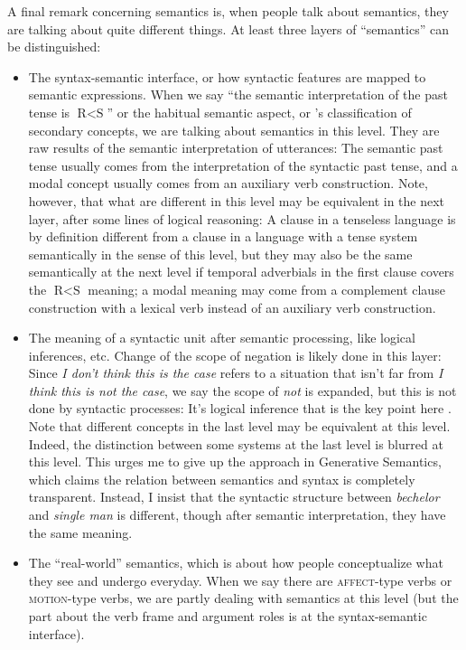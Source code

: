 \documentclass[UTF8, a4paper, oneside, scheme=plain]{ctexrep}
\newcommand{\corpus}[1]{\emph{#1}}
\newcommand{\category}[1]{\textsc{#1}}
\begin{document}
A final remark concerning semantics is,
when people talk about semantics, 
they are talking about quite different things.
At least three layers of ``semantics'' can be distinguished:
\begin{itemize}
    \item The syntax-semantic interface,
    or how syntactic features are mapped to semantic expressions. 
    When we say ``the semantic interpretation of the past tense 
    is $\text{R} < \text{S}$'' or the habitual semantic aspect,
    or \citet{dixon2005semantic}'s classification of secondary concepts,
    we are talking about semantics in this level.
    They are raw results of the semantic interpretation of utterances:
    The semantic past tense usually comes from the interpretation of the syntactic past tense,
    and a modal concept usually comes from an auxiliary verb construction.
    Note, however, that
    what are different in this level may be equivalent in the next layer,
    after some lines of logical reasoning:
    A clause in a tenseless language 
    is by definition different from a clause in a language with a tense system 
    semantically in the sense of this level, 
    but they may also be the same semantically at the next level
    if temporal adverbials in the first clause covers the $\text{R} < \text{S}$ meaning;
    a modal meaning may come from a complement clause construction with a lexical verb
    instead of an auxiliary verb construction.
    \item The meaning of a syntactic unit 
    after semantic processing, like logical inferences, etc. 
    Change of the scope of negation 
    is likely done in this layer: 
    Since \corpus{I don't think this is the case} 
    refers to a situation that isn't far from \corpus{I think this is not the case},
    we say the scope of \corpus{not} is expanded,
    but this is not done by syntactic processes:
    It's logical inference that is the key point here
    \citep{zeijlstra2018does}.
    Note that different concepts in the last level may be equivalent at this level.
    Indeed, the distinction between some systems at the last level is blurred 
    at this level.
    This urges me to give up the approach in Generative Semantics, 
    which claims the relation between semantics and syntax is completely transparent.
    Instead, I insist that 
    the syntactic structure between \corpus{bechelor} and \corpus{single man} 
    is different, though after semantic interpretation,
    they have the same meaning.
    \item The ``real-world'' semantics, 
    which is about how people conceptualize what they see and undergo everyday.
    When we say there are \category{affect}-type verbs or \category{motion}-type verbs, 
    we are partly dealing with semantics at this level
    (but the part about the verb frame and argument roles 
    is at the syntax-semantic interface).
\end{itemize}
\end{document}
